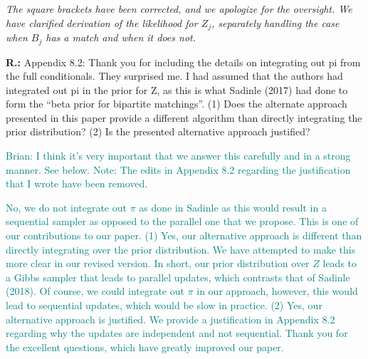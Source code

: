 \documentclass[letterpaper, parskip]{scrartcl}
\newcommand{\pointRaised}[2]{%
	\textbf{#1.\theresponsectr:} #2
}
\newcounter{responsectr}[section]     %
\newcommand{\reply}[1]{%
	\refstepcounter{responsectr}%
		\begin{tcolorbox}
			\itshape #1
		\end{tcolorbox}
}
\begin{document}
\reply{%
	The square brackets have been corrected, and we apologize for the oversight. We have clarified derivation of the likelihood for $Z_j$, separately handling the case when $B_j$ has a match and when it does not.
}

	\pointRaised{R}{%
Appendix 8.2: Thank you for including the details on integrating out pi from the full conditionals. They surprised me. I had assumed that the authors had integrated out pi in the prior for Z, as this is what Sadinle (2017) had done to form the “beta prior for bipartite matchings”. (1) Does the alternate approach presented in this paper provide a different algorithm than directly integrating the prior distribution? (2) Is the presented alternative approach justified?}

\textcolor{teal}{Brian: I think it's very important that we answer this carefully and in a strong manner. See below. Note: The edits in Appendix 8.2 regarding the justification that I wrote have been removed.}

\textcolor{teal}{No, we do not integrate out $\pi$ as done in Sadinle as this would result in a sequential sampler as opposed to the parallel one that we propose. This is one of our contributions to our paper. (1) Yes, our alternative approach is different than directly integrating over the prior distribution. We have attempted to make this more clear in our revised version. In short, our prior distribution over $Z$ leads to a Gibbs sampler that leads to parallel updates, which contrasts that of Sadinle (2018). Of course, we could integrate out $\pi$ in our approach, however, this would lead to sequential updates, which would be slow in practice. (2) Yes, our alternative approach is justified. We provide a justification in Appendix 8.2 regarding why the updates are independent and not sequential. Thank you for the excellent questions, which have greatly improved our paper. }



%
%	
%
\end{document}
